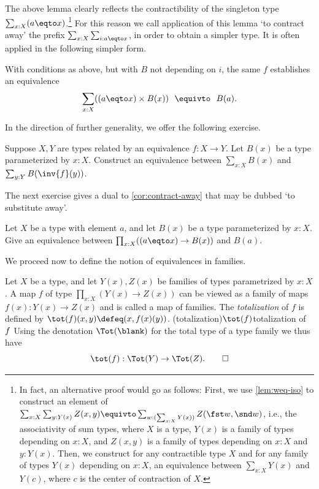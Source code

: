 The above lemma clearly reflects the  contractibility of the
singleton type $\sum_{x:X}(a \eqto x)$.\footnote{%
  In fact, an alternative proof would go as follows:
  \label{ft:Sigma-assoc}
  First, we use \cref{lem:weq-iso} to construct an element of
  $\sum_{x:X}\sum_{y:Y(x)}Z(x,y)
  \equivto \sum_{w : (\sum_{x:X}Y(x))}Z(\fst w,\snd w)$, i.e.,
  the associativity of sum types, where $X$ is a type,
  $Y(x)$ is a family of types depending on $x:X$,
  and $Z(x,y)$ is a family of types depending on $x:X$ and $y:Y(x)$.
  Then, we construct for any contractible type $X$
  and for any family of types $Y(x)$ depending on $x:X$,
  an equivalence between $\sum_{x:X}Y(x)$ and $Y(c)$,
  where $c$ is the center of contraction of $X$.}
For this reason
we call application of this lemma `to contract away'
the prefix $\sum_{x:X} \sum_{i: a \eqto x}$, in order
to obtain a simpler type. It is often applied
in the following simpler form.

\begin{corollary}\label{cor:contract-away}
With conditions as above, but with $B$ not depending on $i$, the same $f$
establishes an equivalence
\[
 \sum_{x:X} ((a \eqto x)\times B(x))~~\equivto~~B(a).
\]
\end{corollary}

In the direction of further generality, we offer the following exercise.

\begin{xca}\label{xca:sum-equiv-base}
  Suppose $X,Y$ are types related by an equivalence $f : X \to Y$.
  Let $B(x)$ be a type parameterized by $x:X$. Construct an 
  equivalence between $\sum_{x:X}B(x)$ and $\sum_{y:Y}B(\inv{f}(y))$.
\end{xca}

The next exercise gives a dual to \cref{cor:contract-away}
that may be dubbed `to substitute away'.

\begin{xca}\label{xca:substitute-away}
Let $X$ be a type with element $a$, and let
$B(x)$ be a type parameterized by $x:X$.
Give an equivalence between $\prod_{x:X} ((a \eqto x)\to B(x))$ and $B(a)$.
\end{xca}

We proceed now to define the notion of equivalences in families.

\begin{definition}\label{def:fiberwise}
Let $X$ be a type, and let $Y(x),Z(x)$ be families of types parametrized
by $x:X$. A map $f$ of type $\prod_{x:X}(Y(x)\to Z(x))$
can be viewed as a family of maps $f(x): Y(x)\to Z(x)$ and is called a
map of families. The \emph{totalization} of $f$ is defined by
$\tot(f)(x,y)\defeq (x,f(x)(y))$.
\glossary(totalization){$\protect\tot(f)$}{totalization of $\protect f$}
Using the denotation $\Tot(\blank)$ for the total type of
a type family we thus have
\[
  \tot(f) : \Tot(Y) \to \Tot(Z).\qedhere
\]
\end{definition}

